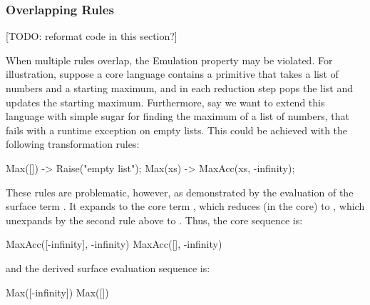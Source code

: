 

\subsubsection{Overlapping Rules}
\label{sec:reval-overlapping}

[TODO: reformat code in this section?]

When multiple rules overlap, the Emulation property may be violated.
For illustration,
suppose a core language contains a  primitive
that takes a list of numbers and a starting maximum, and in each reduction
step pops the list and updates the starting maximum. Furthermore, say
we want to extend this language with simple sugar for finding the maximum
of a list of numbers, that fails with a runtime exception on empty
lists. This could be achieved with the following transformation rules:
\begin{Codes}
Max([]) -> Raise("empty list");
Max(xs) -> MaxAcc(xs, -infinity);
\end{Codes}

These rules are problematic, however, as demonstrated by the evaluation of
the surface term . It expands to the core term
, which reduces (in the core)
to , which unexpands by the second rule above to
. Thus, the core sequence is:
\begin{Codes}
    MaxAcc([-infinity], -infinity)
\CoreStep MaxAcc([], -infinity)
\end{Codes}
and the derived surface evaluation sequence is:
\begin{Codes}
    Max([-infinity])
\SurfStep Max([])
\end{Codes}

